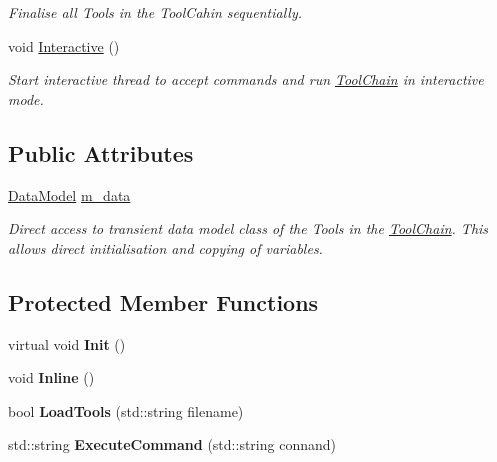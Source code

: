 \begin{DoxyCompactItemize}
\begin{DoxyCompactList}\small\item\em Finalise all Tools in the Tool\-Cahin sequentially. \end{DoxyCompactList}\item 
\hypertarget{classToolChain_a9bb47b83b6b85c3b0fab75af0cda19bf}{void \hyperlink{classToolChain_a9bb47b83b6b85c3b0fab75af0cda19bf}{Interactive} ()}\label{classToolChain_a9bb47b83b6b85c3b0fab75af0cda19bf}

\begin{DoxyCompactList}\small\item\em Start interactive thread to accept commands and run \hyperlink{classToolChain}{Tool\-Chain} in interactive mode. \end{DoxyCompactList}\end{DoxyCompactItemize}
\subsection*{Public Attributes}
\begin{DoxyCompactItemize}
\item 
\hypertarget{classToolChain_a92c81316d0c0b16ee9e4a084dd976f83}{\hyperlink{classDataModel}{Data\-Model} \hyperlink{classToolChain_a92c81316d0c0b16ee9e4a084dd976f83}{m\-\_\-data}}\label{classToolChain_a92c81316d0c0b16ee9e4a084dd976f83}

\begin{DoxyCompactList}\small\item\em Direct access to transient data model class of the Tools in the \hyperlink{classToolChain}{Tool\-Chain}. This allows direct initialisation and copying of variables. \end{DoxyCompactList}\end{DoxyCompactItemize}
\subsection*{Protected Member Functions}
\begin{DoxyCompactItemize}
\item 
\hypertarget{classToolChain_ab705c173cb72d1d35865f7435bcb9f0b}{virtual void {\bfseries Init} ()}\label{classToolChain_ab705c173cb72d1d35865f7435bcb9f0b}

\item 
\hypertarget{classToolChain_ac1cc0e9d9f6b2d23adb9eab2d7a58119}{void {\bfseries Inline} ()}\label{classToolChain_ac1cc0e9d9f6b2d23adb9eab2d7a58119}

\item 
\hypertarget{classToolChain_ac1b120b81163d9e00ee778fbc40ddb23}{bool {\bfseries Load\-Tools} (std\-::string filename)}\label{classToolChain_ac1b120b81163d9e00ee778fbc40ddb23}

\item 
\hypertarget{classToolChain_a6ce65465365bf2b6da10b5d28028afcb}{std\-::string {\bfseries Execute\-Command} (std\-::string connand)}\label{classToolChain_a6ce65465365bf2b6da10b5d28028afcb}

\end{DoxyCompactItemize}
